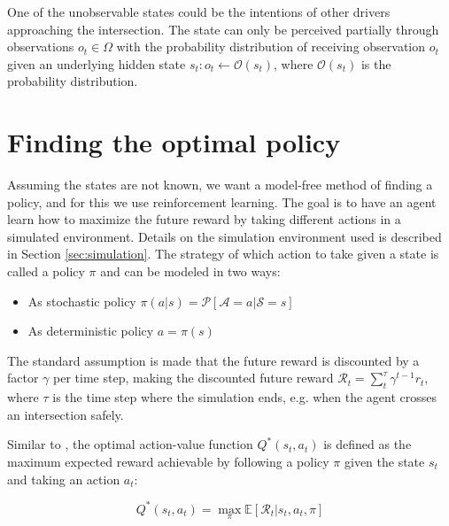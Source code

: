 One of the unobservable states could be the intentions of other drivers approaching the intersection. The state can only be perceived partially through observations $o_t\in \Omega$ with the probability distribution of receiving observation $o_t$ given an underlying hidden state $s_{t}: o_t \leftarrow \mathcal{O}(s_{t})$, where $\mathcal{O}(s_t)$ is the probability distribution. 

\section{Finding the optimal policy}
\label{sec:policy} 
Assuming the states are not known, we want a model-free method of finding a policy, and for this we use reinforcement learning. The goal is to have an agent learn how to maximize the future reward by taking different actions in a simulated environment. Details on the simulation environment used is described in Section \ref{sec:simulation}. The strategy of which action to take given a state is called a policy $\pi$ and can be modeled in two ways: 

\begin{itemize}
	\item As stochastic policy $\pi(a|s) = \mathcal{P}[\mathcal{A}=a|\mathcal{S}=s]$
	\item As deterministic policy $a = \pi(s)$
\end{itemize}
The standard assumption is made that the future reward is discounted by a factor $\gamma$ per time step, making the discounted future reward $\mathcal{R}_t = \sum_{t}^{\tau} \gamma^{t-1} r_t$, where $\tau$ is the time step where the simulation ends, e.g. when the agent crosses an intersection safely. 

Similar to \cite{Mnih2015}, the optimal action-value function $Q^*(s_t, a_t)$ is defined as the maximum expected reward achievable by following a policy $\pi$ given the state $s_t$ and taking an action $a_t$:

\begin{equation}
Q^*(s_t,a_t)= \max_{\pi} \mathbb{E}[\mathcal{R}_t | s_t, a_t, \pi]
\end{equation}


